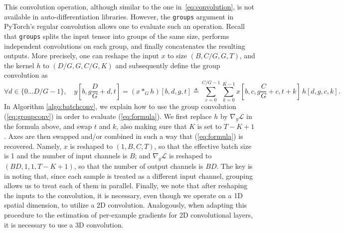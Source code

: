 \documentclass[11pt]{article}
\begin{document}
This convolution operation, although similar to the one in~\eqref{eq:convolution}, 
is not available in auto-differentiation libraries.
However, the \texttt{groups} argument in PyTorch's regular convolution
allows one to evaluate such an operation. Recall that \texttt{groups} splits
the input tensor into groups of the same size, performs independent convolutions
on each group, and finally concatenates the resulting outputs. More
precisely, one can reshape the input $x$ to size $(B, C/G, G, T)$, and the kernel
$h$ to $(D/G, G, C/G, K)$ and subsequently define the group convolution as
\begin{equation}
    \forall d \in \{0 \hdots D/G-1\} ,\quad y[b, g\frac{D}{G} + d, t] = (x
    \ast_G h) [b, d, g, t] \triangleq \sum_{c=0}^{C/G-1} \sum_{k=0}^{K-1}
    x[b, c, g\frac{C}{G} + c, t+k] \, h[d, g, c, k].
    \label{eq:groupconv}
\end{equation}
In Algorithm \ref{algo:batchconv}, we explain how to use the group
convolution (\ref{eq:groupconv}) in order to evaluate (\ref{eq:formula}).
We first replace $h$ by $\nabla_y \mathcal{L}$ in the formula above, and 
swap $t$ and $k$, also making sure that $K$ is set to $T - K + 1$.
Axes are then swapped and/or combined in such a way that (\ref{eq:formula})
is recovered. Namely, $x$ is reshaped to $(1, B, C, T)$, so that the
effective batch size is 1 and the number of input channels is $B$; and
$\nabla_y \mathcal{L}$ is reshaped to $(BD, 1, 1, T - K + 1)$, so that the
number of output channels is $BD$. The key is in noting that, since each sample
is treated as a different input channel, grouping allows us to treat each of
them in parallel. Finally, we note that after reshaping the inputs to the
convolution, it is necessary, even though we operate on a 1D spatial
dimension, to utilize a 2D convolution.  Analogously, when adapting this
procedure to the estimation of per-example gradients for 2D convolutional
layers, it is necessary to use a 3D convolution.
\end{document}

